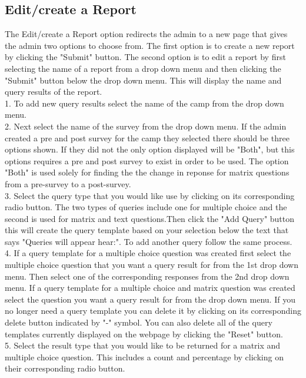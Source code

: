 \documentclass[letterpaper,10pt,serif, draftclsnofoot,onecolumn, compsoc, titlepage]{IEEEtran}
\begin{document}
\subsection{Edit/create a Report}
The Edit/create a Report option redirects the admin to a new page that gives the admin two options to choose from. The first option is to create a new report by clicking the "Submit" button. The second option is to edit a report by first selecting the name of a report from a drop down menu and then clicking the "Submit" button below the drop down menu. This will display the name and query results of the report.\\
1. To add new query results select the name of the camp from the drop down menu.\\
2. Next select the name of the survey from the drop down menu. If the admin created a pre and post survey for the camp they selected there should be three options shown. If they did not the only option displayed will be "Both", but this options requires a pre and post survey to exist in order to be used. The option "Both" is used solely for finding the the change in reponse for matrix questions from a pre-survey to a post-survey.\\ 
3. Select the query type that you would like use by clicking on its corresponding radio button. 
The two types of queries include one for multiple choice and the second is used for matrix and text questions.Then click the "Add Query" button this will create the query template based on your selection below the text that says "Queries will appear hear:". To add another query follow the same process.\\
4. If a query template for a multiple choice question was created first select the multiple choice question that you want a query result for from the 1st drop down menu. Then select one of the corresponding responses from the 2nd drop down menu. If a query template for a multiple choice and matrix question was created select the question you want a query result for from the drop down menu. If you no longer need a query template you can delete it by clicking on its corresponding delete button indicated by "-" symbol. You can also delete all of the query templates currently displayed on the webpage by clicking the "Reset" button.\\ 
5. Select the result type that you would like to be returned for a matrix and multiple choice question. This includes a count and percentage by clicking on their corresponding radio button.\\
\end{document}
